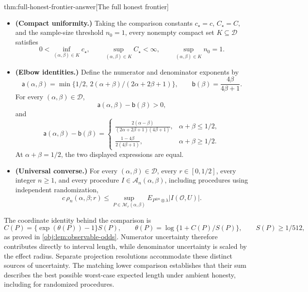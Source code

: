 \documentclass[11pt]{article}
\begin{document}
\begin{theoremv}{thm:full-honest-frontier-answer}[The full honest frontier]
\begin{itemize}
\item \textbf{(Compact uniformity.)}
Taking the comparison constants \(c_\star=c\), \(C_\star=C\), and the sample-size threshold \(n_0=1\), every nonempty compact set \(K\subseteq\mathcal D\) satisfies
\[
0<\inf_{(\alpha,\beta)\in K}c_\star,\qquad
\sup_{(\alpha,\beta)\in K}C_\star<\infty,\qquad
\sup_{(\alpha,\beta)\in K}n_0=1.
\]

\item \textbf{(Elbow identities.)}
Define the numerator and denominator exponents by
\[
\mathsf a(\alpha,\beta)
=\min\{1/2,\,2(\alpha+\beta)/(2\alpha+2\beta+1)\},
\qquad
\mathsf b(\beta)=\frac{4\beta}{4\beta+1}.
\]
For every \((\alpha,\beta)\in\mathcal D\),
\[
\mathsf a(\alpha,\beta)-\mathsf b(\beta)>0,
\]
and
\[
\mathsf a(\alpha,\beta)-\mathsf b(\beta)
=
\begin{cases}
\displaystyle
\frac{2(\alpha-\beta)}
{(2\alpha+2\beta+1)(4\beta+1)},
&\alpha+\beta\le1/2,\\[6pt]
\displaystyle
\frac{1-4\beta}{2(4\beta+1)},
&\alpha+\beta\ge1/2.
\end{cases}
\]
At \(\alpha+\beta=1/2\), the two displayed expressions are equal.

\item \textbf{(Universal converse.)}
For every \((\alpha,\beta)\in\mathcal D\), every \(r\in[0,1/2]\), every integer \(n\ge1\), and every procedure \(I\in\mathcal A_n(\alpha,\beta)\), including procedures using independent randomization,
\[
c\,\rho_n(\alpha,\beta;r)
\le
\sup_{P\in\mathcal M_r(\alpha,\beta)}
E_{P^{\otimes n}\otimes\lambda}
\bigl|I(\mathcal O,U)\bigr|.
\]
\end{itemize}
\end{theoremv}

The coordinate identity behind the comparison is
\[
C(P)=\{\exp(\theta(P))-1\}S(P),
\qquad
\theta(P)=\log\{1+C(P)/S(P)\},
\qquad S(P)\ge1/512,
\]
as proved in \cref{obj:lem:observable-odds}. Numerator uncertainty therefore contributes directly to interval length, while denominator uncertainty is scaled by the effect radius. Separate projection resolutions accommodate these distinct sources of uncertainty. The matching lower comparison establishes that their sum describes the best possible worst-case expected length under ambient honesty, including for randomized procedures.
\end{document}
